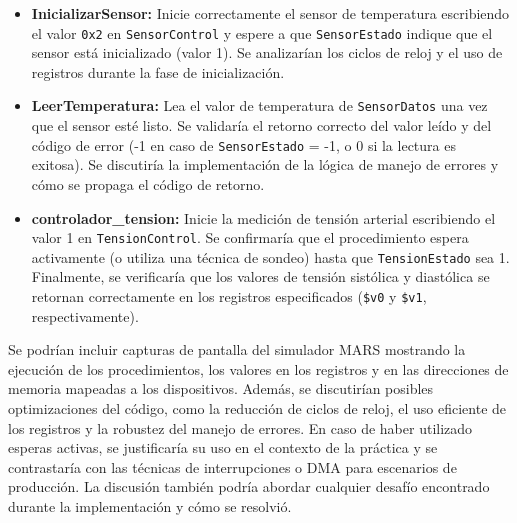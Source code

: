 \documentclass[12pt]{article}
\begin{document}
\begin{itemize}
    \item \textbf{InicializarSensor:} Inicie correctamente el sensor de temperatura escribiendo el valor \texttt{0x2} en \texttt{SensorControl} y espere a que \texttt{SensorEstado} indique que el sensor está inicializado (valor 1). Se analizarían los ciclos de reloj y el uso de registros durante la fase de inicialización.
    \item \textbf{LeerTemperatura:} Lea el valor de temperatura de \texttt{SensorDatos} una vez que el sensor esté listo. Se validaría el retorno correcto del valor leído y del código de error (-1 en caso de \texttt{SensorEstado} = -1, o 0 si la lectura es exitosa). Se discutiría la implementación de la lógica de manejo de errores y cómo se propaga el código de retorno.
    \item \textbf{controlador\_tension:} Inicie la medición de tensión arterial escribiendo el valor 1 en \texttt{TensionControl}. Se confirmaría que el procedimiento espera activamente (o utiliza una técnica de sondeo) hasta que \texttt{TensionEstado} sea 1. Finalmente, se verificaría que los valores de tensión sistólica y diastólica se retornan correctamente en los registros especificados (\texttt{\$v0} y \texttt{\$v1}, respectivamente).
\end{itemize}

Se podrían incluir capturas de pantalla del simulador MARS mostrando la ejecución de los procedimientos, los valores en los registros y en las direcciones de memoria mapeadas a los dispositivos. Además, se discutirían posibles optimizaciones del código, como la reducción de ciclos de reloj, el uso eficiente de los registros y la robustez del manejo de errores. En caso de haber utilizado esperas activas, se justificaría su uso en el contexto de la práctica y se contrastaría con las técnicas de interrupciones o DMA para escenarios de producción. La discusión también podría abordar cualquier desafío encontrado durante la implementación y cómo se resolvió.
\end{document}
